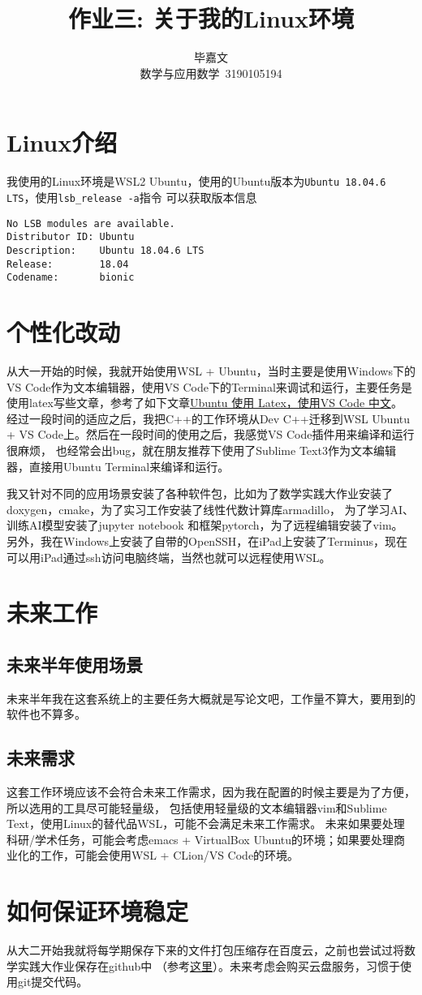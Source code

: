 \documentclass[UTF8]{ctexart}
\title{作业三: 关于我的Linux环境}
\author{毕嘉文 \\ 数学与应用数学\ 3190105194}
\begin{document}
\maketitle

\section{Linux介绍}
我使用的Linux环境是WSL2 Ubuntu，使用的Ubuntu版本为\verb|Ubuntu 18.04.6 LTS|，使用\verb|lsb_release -a|指令
可以获取版本信息\begin{verbatim}
No LSB modules are available.
Distributor ID: Ubuntu
Description:    Ubuntu 18.04.6 LTS
Release:        18.04
Codename:       bionic
\end{verbatim}

\section{个性化改动}
从大一开始的时候，我就开始使用WSL + Ubuntu，当时主要是使用Windows下的VS Code作为文本编辑器，使用VS Code下的Terminal来调试和运行，主要任务是
使用latex写些文章，参考了如下文章\href{https://zhuanlan.zhihu.com/p/65931654}{Ubuntu 使用 Latex，使用VS Code 中文}。
经过一段时间的适应之后，我把C++的工作环境从Dev C++迁移到WSL Ubuntu + VS Code上。然后在一段时间的使用之后，我感觉VS Code插件用来编译和运行很麻烦，
也经常会出bug，就在朋友推荐下使用了Sublime Text3作为文本编辑器，直接用Ubuntu Terminal来编译和运行。\par
我又针对不同的应用场景安装了各种软件包，比如为了数学实践大作业安装了doxygen，cmake，为了实习工作安装了线性代数计算库armadillo\cite{armadillo}，
为了学习AI、训练AI模型安装了jupyter notebook 和框架pytorch，为了远程编辑安装了vim。
另外，我在Windows上安装了自带的OpenSSH，在iPad上安装了Terminus，现在可以用iPad通过ssh访问电脑终端，当然也就可以远程使用WSL。

\section{未来工作}
\subsection{未来半年使用场景}
未来半年我在这套系统上的主要任务大概就是写论文吧，工作量不算大，要用到的软件也不算多。
\subsection{未来需求}
这套工作环境应该不会符合未来工作需求，因为我在配置的时候主要是为了方便，所以选用的工具尽可能轻量级，
包括使用轻量级的文本编辑器vim和Sublime Text，使用Linux的替代品WSL，可能不会满足未来工作需求。
未来如果要处理科研/学术任务，可能会考虑emacs + VirtualBox Ubuntu的环境；如果要处理商业化的工作，可能会使用WSL + CLion/VS Code的环境。


\section{如何保证环境稳定}
从大二开始我就将每学期保存下来的文件打包压缩存在百度云，之前也尝试过将数学实践大作业保存在github中
（参考\href{https://github.com/bjw010529/test-work}{这里}）。未来考虑会购买云盘服务，习惯于使用git提交代码。




\end{document}
